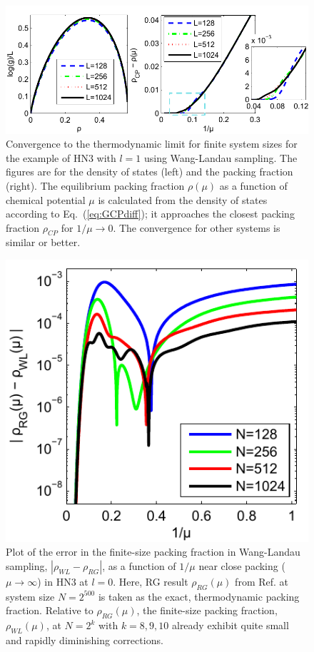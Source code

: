 \begin{figure}
\centering \includegraphics[width=1\columnwidth]{Chapter-2/Paper_ConvergenceHN3_Plot2}
\protect\caption{Convergence to the thermodynamic limit for finite system sizes for
the example of HN3 with $l=1$ using Wang-Landau sampling. The figures are
for the density of states (left) and the packing fraction (right). The
equilibrium packing fraction $\rho(\mu)$ as a function of chemical
potential $\mu$ is calculated from the density of states according
to Eq.~(\ref{eq:GCPdiff}); it approaches the closest packing fraction
$\rho_{CP}$ for $1/\mu\to0$. The convergence for other systems is
similar or better. }
\label{fig:WLconverge} 
\end{figure}


\begin{figure}[h]
\centering\includegraphics[width=0.6\columnwidth]{Chapter-2/Paper_HN3_l0_RGvsWL_error-eps-converted-to}\protect\caption{\label{fig:RGvsWL} 
Plot of the error in the finite-size packing fraction
in Wang-Landau sampling, $\left|\rho_{WL}-\rho_{RG}\right|$, as a
function of $1/\mu$ near close packing ($\mu\to\infty$) in HN3 at
$l=0$. Here, RG result $\rho_{RG}(\mu)$ from Ref. \protect\cite{BoHa11}
at system size $N=2^{500}$ is taken as the exact, thermodynamic packing
fraction. Relative to $\rho_{RG}(\mu)$, the finite-size packing fraction,
$\rho_{WL}(\mu)$, at $N=2^{k}$ with $k=8,9,10$ already exhibit
quite small and rapidly diminishing corrections. }
\end{figure}


